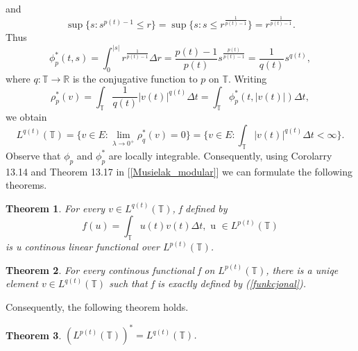 \documentclass[12pt,a4paper,oneside,titlepage]{article}
\newtheorem{Twierdzenie}{Theorem}
\begin{document}
and
\begin{equation}
\nonumber
\sup \lbrace s : s^{p(t)-1} \leq r \rbrace = \sup \lbrace s : s \leq r^{\frac{1}{p(t)-1}} \rbrace= r^{\frac{1}{p(t)-1}}.
\end{equation}
Thus
\begin{equation}
\phi_p^* (t,s) =\int_{0}^{\vert s \vert} r^{\frac{1}{p(t)-1}} \Delta r = \frac{p(t)-1}{p(t)} s^{\frac{p(t)}{p(t)-1}} = \frac{1}{q(t)} s^{q(t)},
\end{equation}
where $q: \mathbb{T} \rightarrow \mathbb{R} $ is the conjugative function to $p$ on $\mathbb{T}$.
Writing 
\begin{equation}
\nonumber
\rho_{p}^*(v) = \int_{\mathbb{T}} \frac{1}{q(t)} \vert v(t) \vert^{q(t)} \Delta t = \int_{\mathbb{T}} \phi_p^* (t, \vert v(t) \vert ) \Delta t,
\end{equation}
we obtain
\begin{equation}
\nonumber
L^{q(t)}(\mathbb{T}) = \lbrace v \in E : \lim_{\lambda \rightarrow 0^+} \rho_q^* (v) = 0 \rbrace = \lbrace v \in E : \int_{\mathbb{T}} \vert v(t) \vert^{q(t)} \Delta t < \infty \rbrace. 
\end{equation}
Observe that $\phi_p$ and $\phi_p^*$ are locally integrable. Consequently, using Corolarry 13.14 and Theorem 13.17 in [\ref{Musielak_modular}] we can formulate the following theorems.
\begin{Twierdzenie}
\label{Twierdzenie18}
\label{funkcjonal_Tw}
 For every $v \in L^{q(t)}(\mathbb{T})$, f defined by
\begin{equation}
\label{funkcjonal}
f(u) = \int_{\mathbb{T}} u(t) v(t) \Delta t , \text{ u } \in L^{p(t)}(\mathbb{T})
\end{equation}
is u continous linear functional over $L^{p(t)}(\mathbb{T})$.
\end{Twierdzenie} 
\begin{Twierdzenie} For every continous functional f on $L^{p(t)}(\mathbb{T})$, there is a uniqe element $v \in L^{q(t)}(\mathbb{T})$ such that f is exactly defined by (\ref{funkcjonal}).
\end{Twierdzenie}
Consequently, the following theorem holds.

\begin{Twierdzenie}
 $(L^{p(t)}(\mathbb{T}))^* = L^{q(t)}(\mathbb{T})$.
\end{Twierdzenie}
\bigskip
\end{document}
